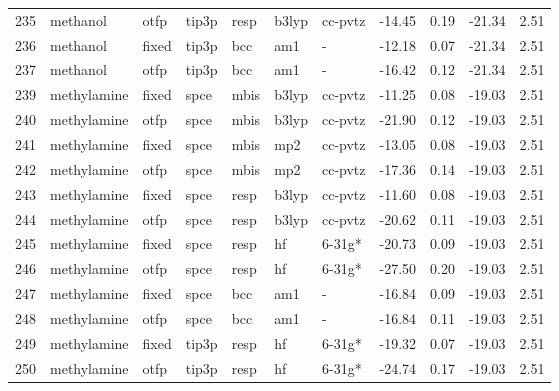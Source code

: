 \begin{tabular}{lllllllrrrr}
235 &                      methanol &   otfp &  tip3p &   resp &   b3lyp &      cc-pvtz &      -14.45 &     0.19 &      -21.34 &      2.51 \\
236 &                      methanol &  fixed &  tip3p &    bcc &     am1 &            - &      -12.18 &     0.07 &      -21.34 &      2.51 \\
237 &                      methanol &   otfp &  tip3p &    bcc &     am1 &            - &      -16.42 &     0.12 &      -21.34 &      2.51 \\
239 &                   methylamine &  fixed &   spce &   mbis &   b3lyp &      cc-pvtz &      -11.25 &     0.08 &      -19.03 &      2.51 \\
240 &                   methylamine &   otfp &   spce &   mbis &   b3lyp &      cc-pvtz &      -21.90 &     0.12 &      -19.03 &      2.51 \\
241 &                   methylamine &  fixed &   spce &   mbis &     mp2 &      cc-pvtz &      -13.05 &     0.08 &      -19.03 &      2.51 \\
242 &                   methylamine &   otfp &   spce &   mbis &     mp2 &      cc-pvtz &      -17.36 &     0.14 &      -19.03 &      2.51 \\
243 &                   methylamine &  fixed &   spce &   resp &   b3lyp &      cc-pvtz &      -11.60 &     0.08 &      -19.03 &      2.51 \\
244 &                   methylamine &   otfp &   spce &   resp &   b3lyp &      cc-pvtz &      -20.62 &     0.11 &      -19.03 &      2.51 \\
245 &                   methylamine &  fixed &   spce &   resp &      hf &       6-31g* &      -20.73 &     0.09 &      -19.03 &      2.51 \\
246 &                   methylamine &   otfp &   spce &   resp &      hf &       6-31g* &      -27.50 &     0.20 &      -19.03 &      2.51 \\
247 &                   methylamine &  fixed &   spce &    bcc &     am1 &            - &      -16.84 &     0.09 &      -19.03 &      2.51 \\
248 &                   methylamine &   otfp &   spce &    bcc &     am1 &            - &      -16.84 &     0.11 &      -19.03 &      2.51 \\
249 &                   methylamine &  fixed &  tip3p &   resp &      hf &       6-31g* &      -19.32 &     0.07 &      -19.03 &      2.51 \\
250 &                   methylamine &   otfp &  tip3p &   resp &      hf &       6-31g* &      -24.74 &     0.17 &      -19.03 &      2.51 \\

\end{tabular}
